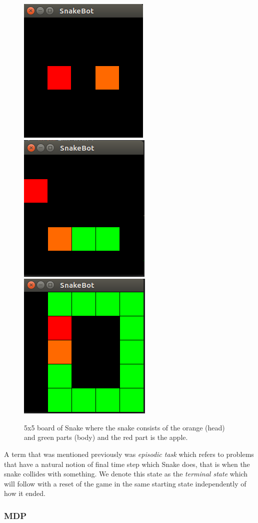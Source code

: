 \documentclass[result.tex]{subfiles}
\begin{document}
    \begin{figure}[H]
        \centering
        \includegraphics[width=.3\textwidth]{./images/snake1}\hfill
        \includegraphics[width=.3\textwidth]{./images/snake2}\hfill
        \includegraphics[width=.3\textwidth]{./images/snake3}
        \label{fig:snake}
        \caption{5x5 board of Snake where the snake consists of the orange (head) and green parts (body) and the red part is the apple.}
    \end{figure}

    A term that was mentioned previously was \textit{episodic task} which refers to problems that have a natural notion of final time step which Snake does, that is when the snake collides with something. We denote this state as the \textit{terminal state} which will follow with a reset of the game in the same starting state independently of how it ended.

    \subsubsection*{MDP}
\end{document}
